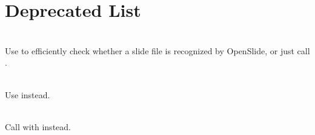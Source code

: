 \chapter{Deprecated List}
\hypertarget{deprecated}{}\label{deprecated}

\begin{DoxyRefList}
\item[Member \doxylink{openslide_8h_af3aad60d3b901dd9a6d1278a52b1105d}{openslide\+\_\+can\+\_\+open} (const char \texorpdfstring{$\ast$}{*}filename)]\hfill \\
\label{deprecated__deprecated000001}%
%
Use  to efficiently check whether a slide file is recognized by Open\+Slide, or just call .  
\item[Member \doxylink{openslide_8h_ad2dfde287c3c84eb5a2e5e7bab3848d9}{openslide\+\_\+get\+\_\+best\+\_\+layer\+\_\+for\+\_\+downsample} (\doxylink{openslide_8h_a990dde8d8caba731de6a9c8895df41cb}{openslide\+\_\+t} \texorpdfstring{$\ast$}{*}osr, double downsample)]\hfill \\
\label{deprecated__deprecated000006}%
%
Use  instead.  
\item[Member \doxylink{openslide_8h_af7647c5d29280fab6b26378bc6b4db9e}{openslide\+\_\+get\+\_\+comment} (\doxylink{openslide_8h_a990dde8d8caba731de6a9c8895df41cb}{openslide\+\_\+t} \texorpdfstring{$\ast$}{*}osr)]\hfill \\
\label{deprecated__deprecated000007}%
%
Call  with  instead.  
\item[Member \doxylink{openslide_8h_a01ace929808942ca6c62218dea7eb2e6}{openslide\+\_\+get\+\_\+layer0\+\_\+dimensions} (\doxylink{openslide_8h_a990dde8d8caba731de6a9c8895df41cb}{openslide\+\_\+t} \texorpdfstring{$\ast$}{*}osr, int64\+\_\+t \texorpdfstring{$\ast$}{*}w, int64\+\_\+t \texorpdfstring{$\ast$}{*}h)]\hfill \\
\label{deprecated__deprecated000003}%

\end{DoxyRefList}
